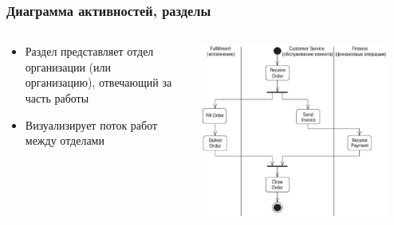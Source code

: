 \documentclass{../../slides-style}
\begin{document}
    \begin{frame}
        \frametitle{Диаграмма активностей, разделы}
        \begin{columns}
            \begin{column}{0.5\textwidth}
                \begin{itemize}
                    \item Раздел представляет отдел организации (или организацию), отвечающий за часть работы
                    \item Визуализирует поток работ между отделами
                \end{itemize}
            \end{column}
            \begin{column}{0.5\textwidth}
                \begin{center}
                    \includegraphics[width=0.9\textwidth]{activitySwimlanes.png}
                \end{center}
            \end{column}
        \end{columns}
    \end{frame}
\end{document}
